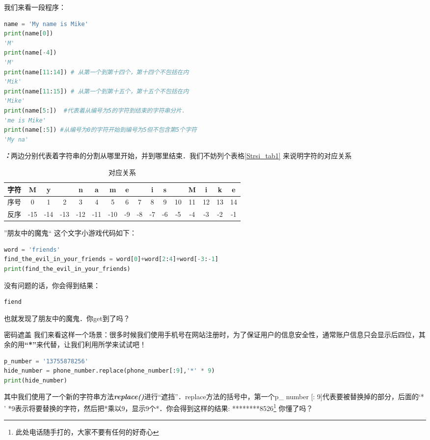 我们来看一段程序：
\begin{lstlisting}[language=python]
name = 'My name is Mike'
print(name[0])
'M'
print(name[-4])
'M'
print(name[11:14]) # 从第一个到第十四个，第十四个不包括在内
'Mik'
print(name[11:15]) # 从第一个到第十五个，第十五个不包括在内
'Mike'
print(name[5:])  #代表着从编号为5的字符到结束的字符串分片．
'me is Mike'
print(name[:5]) #从编号为0的字符开始到编号为5但不包含第5个字符
'My na'
\end{lstlisting}
\textbf{\textsl{：}}两边分别代表着字符串的分割从哪里开始，并到哪里结束．我们不妨列个表格\autoref{Strsi_tab1} 来说明字符的对应关系
\begin{table}[ht]
\centering
\caption{对应关系}\label{Strsi_tab1}
\begin{tabular}{|c|c|c|c|c|c|c|c|c|c|c|c|c|c|c|c|}
\hline
 字符  & M & y &   & n & a & m & e &   & i & s &   & M & i & k &e\\
\hline
 序号  & 0 & 1 & 2 & 3 & 4 & 5 & 6 & 7 & 8 & 9 & 10 & 11 & 12 & 13 & 14\\
\hline
 反序  & -15 & -14 & -13 & -12 & -11 & -10 & -9 & -8 & -7 & -6 & -5 & -4 & -3 & -2 & -1\\
\hline
\end{tabular}
\end{table}
\begin{example}{”朋友中的魔鬼“}
这个文字小游戏代码如下：
\begin{lstlisting}[language=python]
word = 'friends'
find_the_evil_in_your_friends = word[0]+word[2:4]+word[-3:-1] 
print(find_the_evil_in_your_friends)
\end{lstlisting}
没有问题的话，你会得到结果：
\begin{lstlisting}[language=python]
fiend
\end{lstlisting}
也就发现了朋友中的魔鬼．你get到了吗？
\end{example}
\begin{example}{密码遮盖}
我们来看这样一个场景：很多时候我们使用手机号在网站注册时，为了保证用户的信息安全性，通常账户信息只会显示后四位，其余的用\textbf{“*”}来代替，让我们利用所学来试试吧！
\begin{lstlisting}[language=python]
p_number = '13755878256'
hide_number = phone_number.replace(phone_number[:9],'*' * 9)
print(hide_number)
\end{lstlisting}
其中我们使用了一个新的字符串方法\textbf{\textsl{replace()}}进行“遮挡”．replace方法的括号中，第一个p_ number [: 9]代表要被替换掉的部分，后面的‘* ' *9表示将要替换的字符，然后把*乘以9，显示9个*．你会得到这样的结果: ********8526\footnote{此处电话随手打的，大家不要有任何的好奇心}
你懂了吗？

\end{example}